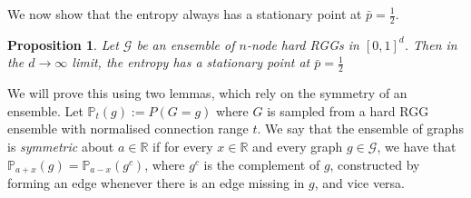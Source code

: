 \documentclass{article}
\newtheorem{proposition}{Proposition}
\begin{document}
We now show that the entropy always has a stationary point at $\bar{p}=\frac{1}{2}$.
\begin{proposition}
    Let $\mathcal{G}$ be an ensemble of $n$-node hard RGGs in $[0,1]^d$. Then in the $d\rightarrow\infty$ limit, the entropy has a stationary point at $\bar{p}=\frac{1}{2}$
\end{proposition}
We will prove this using two lemmas, which rely on the symmetry of an ensemble. Let $\mathbb{P}_t(g) := P(G=g)$ where $G$ is sampled from a hard RGG ensemble with normalised connection range $t$. We say that the ensemble of graphs is \textit{symmetric} about $a\in\mathbb{R}$ if for every $x \in \mathbb{R}$ and every graph $g\in \mathcal{G}$, we have that $\mathbb{P}_{a+x}(g) = \mathbb{P}_{a-x}(g^c)$, where $g^c$ is the complement of $g$, constructed by forming an edge whenever there is an edge missing in $g$, and vice versa.   
\end{document}
